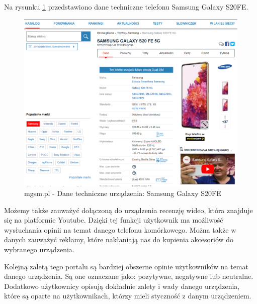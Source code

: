 Na rysunku \ref*{mgsm_3} przedstawiono dane techniczne telefonu Samsung Galaxy S20FE.
\begin{figure}[H]
    \centering
    \includegraphics[scale=0.48]{img/mgsm/DetailsMgsm.png}
    \caption{mgsm.pl - Dane techniczne urządzenia: Samsung Galaxy S20FE}
    \label{mgsm_3}
\end{figure}
Możemy także zauważyć dołączoną do urządzenia recenzję wideo, która znajduje się na platformie Youtube. Dzięki tej funkcji użytkownik ma możliwość wysłuchania opinii na temat danego telefonu komórkowego. Można także w danych zauważyć reklamy, które nakłaniają nas do kupienia akcesoriów do wybranego urządzenia.

Kolejną zaletą tego portalu są bardziej obszerne opinie użytkowników na temat danego urządzenia. Są one oznaczane jako: pozytywne, negatywne lub neutralne. Dodatkowo użytkownicy opisują dokładnie zalety i wady danego urządzenia, które są oparte na użytkownikach, którzy mieli styczność z danym urządzeniem.  

